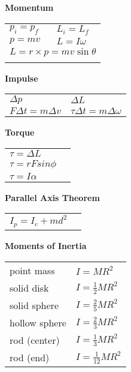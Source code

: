 \documentclass[12pt]{article}
\begin{document}
%
%
\begin{minipage}[t]{.5\textwidth}
\textbf{Momentum} \\[6pt]
\begin{tabular}{p{4cm} p{6cm}}
	$p_i = p_f$ & $L_i = L_f$ \\[6pt]	
	$p = mv$ & $L = I\omega$ \\[6pt]
	\multicolumn{2}{l}{$L = r \times p = mv \sin \theta $}\\[6pt]
	\\[6pt]
\end{tabular}
\end{minipage}
%
%
\begin{minipage}[t]{.5\textwidth}
\textbf{Impulse} \\[6pt]
\begin{tabular}{p{4cm} p{6cm}}
	$\Delta p$ & $\Delta L$ \\[6pt]
	$F\Delta t = m \Delta v$ & $\tau \Delta t = m \Delta \omega $\\[6pt]	
\end{tabular}	
\end{minipage}

%
%
\begin{minipage}[t]{.5\textwidth}
\textbf{Torque} \\[6pt]
\begin{tabular}{p{4cm} p{6cm}}
	$\tau = \Delta L$ \\[6pt]
	$\tau = rFsin \phi$ \\[6pt]
	$\tau = I\alpha$ \\[6pt]	
\end{tabular}	

\vspace{24pt}
\textbf{Parallel Axis Theorem}\\[6pt]
\begin{tabular}{p{4cm} p{6cm}}
	$I_p = I_c + md^2$ & \\[6pt]	
\end{tabular}
\end{minipage}
%
%
\begin{minipage}[t]{.5\textwidth}
\textbf{Moments of Inertia} \\[6pt]
\begin{tabular}{p{4cm} p{6cm}}
	point mass & $I = MR^2$ \\[6pt]
	solid disk & $I = \frac{1}{2} MR^2$ \\[6pt]
	solid sphere & $I = \frac{2}{5} MR^2$ \\[6pt]
	hollow sphere & $I = \frac{2}{3} MR^2$ \\[6pt]
	rod (center) & $I = \frac{1}{3} MR^2$ \\[6pt]
	rod (end) & $I = \frac{1}{12} MR^2$ \\[6pt]
\end{tabular}
\end{minipage}
\end{document}
